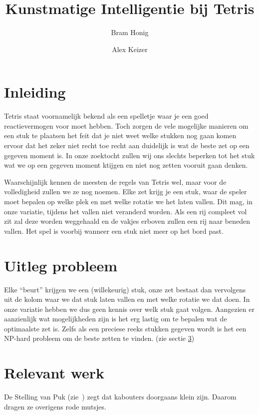 \documentclass[10pt]{article}
\author{Bram Honig \and Alex Keizer}
\title{Kunstmatige Intelligentie bij Tetris}
\begin{document}

\maketitle

\section{Inleiding} 
Tetris staat voornamelijk bekend als een spelletje waar je een goed reactievermogen voor moet hebben. Toch zorgen de vele mogelijke manieren om een stuk te plaatsen het feit dat je niet weet welke stukken nog gaan komen ervoor dat het zeker niet recht toe recht aan duidelijk is wat de beste zet op een gegeven moment is. In onze zoektocht zullen wij ons slechts beperken tot het stuk wat we op een gegeven moment ktijgen en niet nog zetten vooruit gaan denken.

Waarschijnlijk kennen de meesten de regels van Tetris wel, maar voor de volledigheid zullen we ze nog noemen. Elke zet krijg je een stuk, waar de speler moet bepalen op welke plek en met welke rotatie we het laten vallen. Dit mag, in onze variatie, tijdens het vallen niet veranderd worden. Als een rij compleet vol zit zal deze worden weggehaald en de vakjes erboven zullen een rij naar beneden vallen. Het spel is voorbij wanneer een stuk niet meer op het bord past.

\section{Uitleg probleem}\label{probleem}

Elke ``beurt'' krijgen we een (willekeurig) stuk, onze zet bestaat dan vervolgens uit de kolom waar we dat stuk laten vallen en met welke rotatie we dat doen. In onze variatie hebben we dus geen kennis over welk stuk gaat volgen. Aangezien er aanzienlijk wat mogelijkheden zijn is het erg lastig om te bepalen wat de optimaalste zet is. Zelfs als een preciese reeks stukken gegeven wordt is het een NP-hard probleem om de beste zetten te vinden. \cite{nphard} (zie sectie \ref{relevant})

\section{Relevant werk}\label{relevant}

De Stelling van Puk (zie~\cite{pukkie}) zegt dat 
kabouters doorgaans klein zijn. Daarom dragen ze overigens rode mutsjes.
\end{document}
